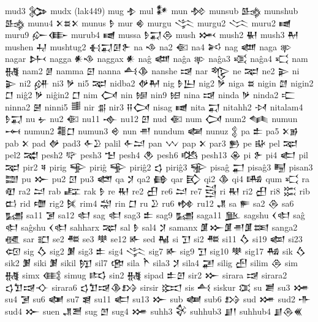  mud3  𒉯   
 mudx  (lak449)   
 mug  𒈮   
 mul  𒀯   
 mun  𒁵   
 munsub  𒈰   
 munshub  𒈰   
 munu4  𒉽𒊺𒉽    
 munus  𒊩   
 mur  𒄯   
 murgu  𒋞   
 murgu2  𒈱   
 muru2  𒉠   
 muru9  𒅎𒂂    
 murub4  𒉠   
 mussa  𒊩𒍑𒁲    
 mush  𒈲   
 mush2  𒈽   
 mush3  𒈹   
 mushen  𒄷   
 mushtug2  𒈬𒍑𒌆𒉿    
 na  𒈾   
 na2  𒈿   
 na4  𒎎   
 nag  𒅘   
 naga  𒉀   
 nagar  𒉄   
 nagga  𒀭𒈾    
 naggax  𒀭   
 naĝ  𒅘   
 naĝa  𒉀   
 naĝa3  𒄤   
 naĝa4  𒄣   
 nam  𒉆   
 nam2  𒉇   
 namma  𒇉   
 nanna  𒋀𒆠    
 nanshe  𒀏   
 nar  𒈜   
 ne  𒉈   
 ne2  𒉌   
 ni  𒉌   
 ni2  𒉎   
 ni3  𒃻   
 ni5  𒉈   
 nidba2  𒉻𒈹    
 nig  𒊩𒌨    
 nig2  𒃻   
 niga  𒊺   
 nigin  𒇔   
 nigin2  𒆸   
 niĝ2  𒃻   
 niĝin2  𒆸   
 nim  𒉏   
 nin  𒎏   
 nin9  𒎐   
 nina  𒀏   
 ninda  𒃻   
 ninda2  𒉒   
 ninna2  𒇧   
 ninni5  𒌃   
 nir  𒉪   
 nir3  𒍝𒉏    
 nisag  𒉠   
 nita  𒍑   
 nitahh2  𒀴   
 nitalam4  𒊩𒍑    
 nu  𒉡   
 nu2  𒈿   
 nu11  𒉢   
 nu12  𒇻   
 nud  𒈿   
 num  𒉏   
 num2  𒈝   
 numun  𒆰   
 numun2  𒍤𒆸    
 numun3  𒄴   
 nun  𒉣   
 nundum  𒅻   
 nunuz  𒉭   
 pa  𒉺   
 pa5  𒉽𒂊    
 pab  𒉽   
 pad  𒉻   
 pad3  𒅆𒊒    
 palil  𒅆𒁺    
 pan  𒉼   
 pap  𒉽   
 par3  𒁖   
 pe  𒄫   
 pel  𒉈   
 pel2  𒉋   
 pesh2  𒉾   
 pesh3  𒈠   
 pesh4  𒊯   
 pesh6  𒆓   
 pesh13  𒊴   
 pi  𒉿   
 pi4  𒅗   
 pil  𒉈   
 pir2  𒎕   
 pirig  𒊊   
 piriĝ  𒊊   
 piriĝ2  𒌓   
 piriĝ3  𒊌   
 pisaĝ  𒂷   
 pisaĝ3  𒋄   
 pisan3  𒊿   
 pu  𒁍   
 pu2  𒇥   
 pu3  𒅤   
 qa  𒋡   
 qa2  𒂵   
 qar  𒃼   
 qi2  𒆠   
 qi4  𒄄   
 qum  𒄣   
 ra  𒊏   
 ra2  𒁺   
 rab  𒊐   
 rak  𒊩   
 re  𒊑   
 re2  𒌷   
 re6  𒁺   
 re7  𒁻   
 ri  𒊑   
 ri2  𒌷   
 ri8  𒈶   
 rib  𒆗   
 rid  𒈩   
 rig2  𒍮   
 rim4  𒁽   
 rin  𒆸   
 ru  𒊒   
 ru6  𒂔   
 ru12  𒂗   
 sa  𒊓   
 sa2  𒁲   
 sa6  𒊷   
 sa11  𒋜   
 sa12  𒊕   
 sag  𒊕   
 sag3  𒉺   
 sag9  𒊷   
 saga11  𒆥   
 sagshu  𒌋𒊕    
 saĝ  𒊕   
 saĝshu  𒌋𒊕    
 sahharx  𒉈   
 sal  𒊩   
 sal4  𒋡   
 samanx  𒂠𒁍𒂠𒉣𒂠𒌅    
 sanga2  𒊫   
 sar  𒊬   
 se2  𒍣   
 se3  𒋧   
 se12  𒅊   
 sed  𒈻   
 si  𒋛   
 si2  𒍣   
 si11  𒋝   
 si19  𒆉   
 si23  𒄢   
 sig  𒋝   
 sig2  𒋠   
 sig3  𒉺   
 sig4  𒋞   
 sig7  𒅊   
 sig9  𒋛   
 sig10  𒋧   
 sig17  𒄀   
 sik  𒋝   
 sik2  𒋠   
 siki  𒋠   
 sikil  𒂖   
 sil7  𒂣   
 sila  𒋻   
 sila3  𒋡   
 sila4  𒃢   
 silig  𒍂
 silim  𒁲
 sim  𒉆   
 simx  𒍼   
 simug  𒌣   
 sin2  𒉆   
 sipad  𒉺𒇻    
 sir2  𒁍   
 sirara  𒀏   
 sirara2  𒌓𒈣𒀏𒋓    
 sirara6  𒌓𒈣𒀏𒆠𒋳    
 sirsir  𒁎   
 sis  𒋀   
 siskur  𒀬   
 su  𒋢   
 su3  𒋤   
 su4  𒋜   
 su6  𒅾   
 su7  𒇭   
 su11  𒅗   
 su13  𒁍   
 sub  𒅢   
 sub6  𒋳   
 sud  𒋤   
 sud2  𒋥   
 sud4  𒁍   
 suen  𒂗𒍪    
 sug  𒆹   
 sug4  𒋤   
 suhh3  𒄗   
 suhhub3  𒋗𒁹    
 suhhub4  𒋗𒁲𒌍    
